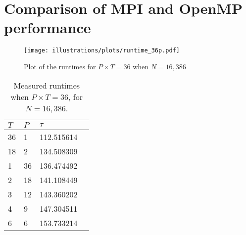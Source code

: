 \section{Comparison of MPI and OpenMP performance} %
\label{sec:comparison_of_mpi_and_openmp_performance}


\begin{figure}[htbp]
  \centering
  \texttt{[image: illustrations/plots/runtime\_36p.pdf]}
  \caption{Plot of the runtimes for $P\times T = 36$ when $N=16,386$}
  \label{fig:runtime_36p}
\end{figure}

\begin{table}[H]
  \centering
  \caption{Measured runtimes when $P\times T = 36$, for $N=16,386$.}
  \label{tab:runtimes_36}
  \begin{tabularx}{0.5\textwidth}{XXXX}
    \toprule
    $T$ & $P$ & $\tau$ \\
    \midrule
    36  &  1  &  112.515614 \\
    18  &  2  &  134.508309 \\
    1   & 36  &  136.474492 \\
    2   & 18  &  141.108449 \\
    3   & 12  &  143.360202 \\
    4   &  9  &  147.304511 \\
    6   &  6  &  153.733214 \\
    \bottomrule
  \end{tabularx}
\end{table}

